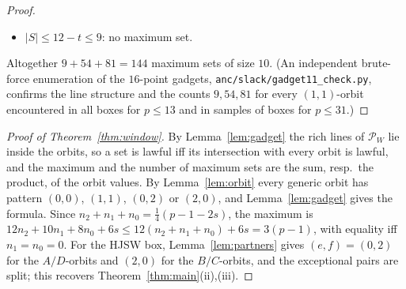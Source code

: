 \documentclass[11pt]{article}
\theoremstyle{remark}
\newcommand{\Pset}{\mathcal{P}}
\begin{document}
\begin{proof}
\begin{itemize}
 two of three ($3\cdot3$): $36$ sets; for $\{\kappa_A,\bar\tau\}$: $B'$ $2$ ways, $A''$ ($\ni\bar\tau$) $3$ ways, $A'$ forced,
 $B''$ $3$ ways: $18$; for $\{\bar\sigma,\kappa_B\}$: symmetrically $18$; for $\{\bar\sigma,\bar\tau\}$: $B''$ $3$, $A''$ $3$,
 $A'$, $B'$ forced: $9$.  Total $36+18+18+9=81$.
\item[$t\ge3$:] $|S|\le12-t\le9$: no maximum set.
\end{itemize}
Altogether $9+54+81=144$ maximum sets of size $10$.  (An independent brute-force enumeration of the $16$-point gadgets,
\texttt{anc/slack/gadget11\_check.py}, confirms the line structure and the counts $9,54,81$ for every $(1,1)$-orbit encountered
in all boxes for $p\le13$ and in samples of boxes for $p\le31$.)
\end{proof}

\begin{proof}[Proof of Theorem~\ref{thm:window}]
By Lemma~\ref{lem:gadget} the rich lines of $\Pset_W$ lie inside the orbits, so a set is lawful iff its intersection with
every orbit is lawful, and the maximum and the number of maximum sets are the sum, resp.\ the product, of the orbit values.
By Lemma~\ref{lem:orbit} every generic orbit has pattern $(0,0)$, $(1,1)$, $(0,2)$ or $(2,0)$, and Lemma~\ref{lem:gadget}
gives the formula.  Since $n_2+n_1+n_0=\tfrac14(p-1-2s)$, the maximum is $12n_2+10n_1+8n_0+6s\le12(n_2+n_1+n_0)+6s=3(p-1)$,
with equality iff $n_1=n_0=0$.  For the HJSW box, Lemma~\ref{lem:partners} gives $(e,f)=(0,2)$ for the $A/D$-orbits and $(2,0)$ for the
$B/C$-orbits, and the exceptional pairs are split; this recovers Theorem~\ref{thm:main}(ii),(iii).
\end{proof}
\end{document}
